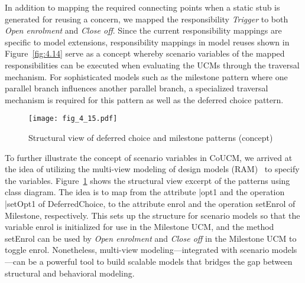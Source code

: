 In addition to mapping the required connecting points when a static stub is generated for reusing a concern, we mapped the responsibility \emph{Trigger} to both \emph{Open enrolment} and \emph{Close off}. Since the current responsibility mappings are specific to model extensions, responsibility mappings in model reuses shown in Figure~\ref{fig:4.14} serve as a concept whereby scenario variables of the mapped responsibilities can be executed when evaluating the UCMs through the traversal mechanism. For sophisticated models such as the milestone pattern where one parallel branch influences another parallel branch, a specialized traversal mechanism is required for this pattern as well as the deferred choice pattern.

\begin{figure}
	\centering
	\texttt{[image: fig\_4\_15.pdf]}
	\caption{Structural view of deferred choice and milestone patterns (concept)}
	\label{fig:4.15}
\end{figure}

To further illustrate the concept of scenario variables in CoUCM, we arrived at the idea of utilizing the multi-view modeling of design models (RAM)~\cite{kienzle2009aspect} to specify the variables. Figure~\ref{fig:4.15} shows the structural view excerpt of the patterns using class diagram. The idea is to map from the attribute {\cls |opt1} and the operation {\cls |setOpt1} of DeferredChoice, to the attribute {\cls enrol} and the operation {\cls setEnrol} of Milestone, respectively. This sets up the structure for scenario models so that the variable {\cls enrol} is initialized for use in the Milestone UCM, and the method {\cls setEnrol} can be used by \emph{Open enrolment} and \emph{Close off} in the Milestone UCM to toggle {\cls enrol}. Nonetheless, multi-view modeling---integrated with scenario models---can be a powerful tool to build scalable models that bridges the gap between structural and behavioral modeling.

